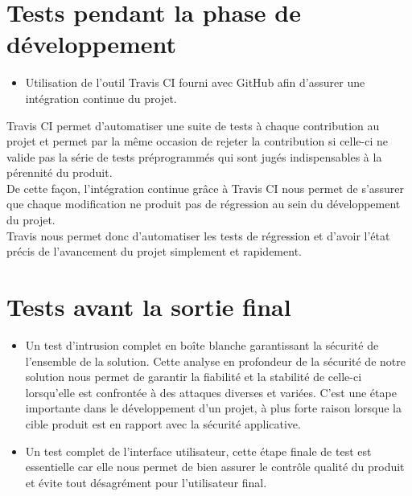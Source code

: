 \section{Tests pendant la phase de développement}
\begin{itemize}
\item Utilisation de l'outil Travis CI fourni avec GitHub afin d'assurer une intégration continue du projet.\\
\end{itemize}
Travis CI permet d'automatiser une suite de tests à chaque contribution au projet et permet par la même occasion de rejeter la contribution si celle-ci ne valide pas la série de tests préprogrammés qui sont jugés indispensables à la pérennité du produit.\\
De cette façon, l'intégration continue grâce à Travis CI nous permet de s'assurer que chaque modification ne produit pas de régression au sein du développement du projet.
\\
Travis nous permet donc d'automatiser les tests de régression et d'avoir l'état précis de l'avancement du projet simplement et rapidement.\\

\section{Tests avant la sortie final}
\begin{itemize}
\item Un test d'intrusion complet en boîte blanche garantissant la sécurité de l'ensemble de la solution. Cette analyse en profondeur de la sécurité de notre solution nous permet de garantir la fiabilité et la stabilité de celle-ci lorsqu’elle est confrontée à des attaques diverses et variées. C'est une étape importante dans le développement d'un projet, à plus forte raison lorsque la cible produit est en rapport avec la sécurité applicative.\\
\item Un test complet de l'interface utilisateur, cette étape finale de test est essentielle car elle nous permet de bien assurer le contrôle qualité du produit et évite tout désagrément pour l'utilisateur final.\\
\end{itemize}